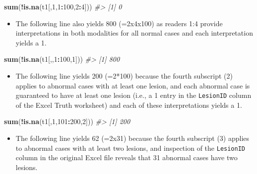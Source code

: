 \documentclass[]{book}
\newenvironment{Shaded}{\begin{snugshade}}{\end{snugshade}}
\newcommand{\CommentTok}[1]{\textcolor[rgb]{0.56,0.35,0.01}{\textit{#1}}}
\newcommand{\DecValTok}[1]{\textcolor[rgb]{0.00,0.00,0.81}{#1}}
\newcommand{\KeywordTok}[1]{\textcolor[rgb]{0.13,0.29,0.53}{\textbf{#1}}}
\newcommand{\NormalTok}[1]{#1}
\newcommand{\OperatorTok}[1]{\textcolor[rgb]{0.81,0.36,0.00}{\textbf{#1}}}
\providecommand{\tightlist}{%
  \setlength{\itemsep}{0pt}\setlength{\parskip}{0pt}}
\begin{document}
\begin{Shaded}
\begin{Highlighting}[]
\KeywordTok{sum}\NormalTok{(}\OperatorTok{!}\KeywordTok{is.na}\NormalTok{(t1[,}\DecValTok{1}\NormalTok{,}\DecValTok{1}\OperatorTok{:}\DecValTok{100}\NormalTok{,}\DecValTok{2}\OperatorTok{:}\DecValTok{4}\NormalTok{]))}
\CommentTok{#> [1] 0}
\end{Highlighting}
\end{Shaded}

\begin{itemize}
\tightlist
\item
  The following line also yields 800 (=2x4x100) as readers 1:4 provide interpretations in both modalities for all normal cases and each interpretation yields a 1.
\end{itemize}

\begin{Shaded}
\begin{Highlighting}[]
\KeywordTok{sum}\NormalTok{(}\OperatorTok{!}\KeywordTok{is.na}\NormalTok{(t1[,,}\DecValTok{1}\OperatorTok{:}\DecValTok{100}\NormalTok{,}\DecValTok{1}\NormalTok{]))}
\CommentTok{#> [1] 800}
\end{Highlighting}
\end{Shaded}

\begin{itemize}
\tightlist
\item
  The following line yields 200 (=2*100) because the fourth subscript (2) applies to abnormal cases with at least one lesion, and each abnormal case is guaranteed to have at least one lesion (i.e., a 1 entry in the \texttt{LesionID} column of the Excel Truth worksheet) and each of these interpretations yields a 1.
\end{itemize}

\begin{Shaded}
\begin{Highlighting}[]
\KeywordTok{sum}\NormalTok{(}\OperatorTok{!}\KeywordTok{is.na}\NormalTok{(t1[,}\DecValTok{1}\NormalTok{,}\DecValTok{101}\OperatorTok{:}\DecValTok{200}\NormalTok{,}\DecValTok{2}\NormalTok{]))}
\CommentTok{#> [1] 200}
\end{Highlighting}
\end{Shaded}

\begin{itemize}
\tightlist
\item
  The following line yields 62 (=2x31) because the fourth subscript (3) applies to abnormal cases with at least two lesions, and inspection of the \texttt{LesionID} column in the original Excel file reveals that 31 abnormal cases have two lesions.
\end{itemize}
\end{document}
